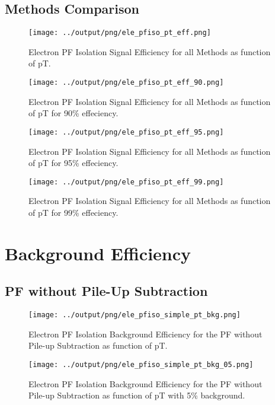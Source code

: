\documentclass[11pt]{book}
\begin{document}
\subsection{Methods Comparison}
\begin{figure}[htb]
\centering
\texttt{[image: ../output/png/ele\_pfiso\_pt\_eff.png]}
\caption{Electron PF Isolation Signal Efficiency for all Methods as function of pT.}
\label{fig:ele_pfiso_pt_eff}
\end{figure}

\begin{figure}[htb]
\centering
\texttt{[image: ../output/png/ele\_pfiso\_pt\_eff\_90.png]}
\caption{Electron PF Isolation Signal Efficiency for all Methods as function of pT for 90\% effeciency.}
\label{fig:ele_pfiso_pt_eff_90}
\end{figure}

\begin{figure}[htb]
\centering
\texttt{[image: ../output/png/ele\_pfiso\_pt\_eff\_95.png]}
\caption{Electron PF Isolation Signal Efficiency for all Methods as function of pT for 95\% effeciency.}
\label{fig:ele_pfiso_pt_eff_95}
\end{figure}

\begin{figure}[htb]
\centering
\texttt{[image: ../output/png/ele\_pfiso\_pt\_eff\_99.png]}
\caption{Electron PF Isolation Signal Efficiency for all Methods as function of pT for 99\% effeciency.}
\label{fig:ele_pfiso_pt_eff_99}
\end{figure}
\clearpage

\section{Background Efficiency}
\subsection{PF without Pile-Up Subtraction}
\begin{figure}[htb]
\centering
\texttt{[image: ../output/png/ele\_pfiso\_simple\_pt\_bkg.png]}
\caption{Electron PF Isolation Background Efficiency for the PF without Pile-up Subtraction as function of pT.}
\label{fig:ele_pfiso_pt_bkg_simple}
\end{figure}

\begin{figure}[htb]
\centering
\texttt{[image: ../output/png/ele\_pfiso\_simple\_pt\_bkg\_05.png]}
\caption{Electron PF Isolation Background Efficiency for the PF without Pile-up Subtraction as function of pT with 5\% background.}
\label{fig:ele_pfiso_pt_bkg_simple_bkg_05}
\end{figure}
\end{document}
